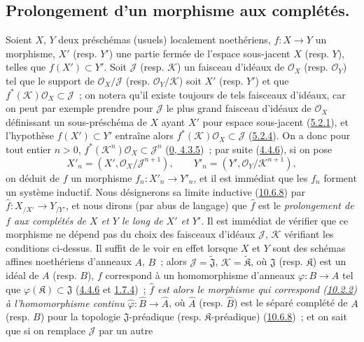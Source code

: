 \subsection{Prolongement d'un morphisme aux complétés.}
\label{subsection:I.10.9-fr}

\begin{env}[10.9.1]
\label{I.10.9.1-fr}
Soient $X$, $Y$ deux préschémas (usuels) localement noethériens,
$f:X\to Y$ un morphisme, $X'$ (resp. $Y'$) une partie fermée de l'espace
sous-jacent $X$ (resp. $Y$), telles que $f(X')\subset Y'$. Soit
$\mathscr{J}$ (resp. $\mathscr{K}$) un faisceau d'idéaux de
$\mathscr{O}_X$ (resp. $\mathscr{O}_Y$) tel que le support de
$\mathscr{O}_X/\mathscr{J}$ (resp. $\mathscr{O}_Y/\mathscr{K}$) soit
$X'$ (resp. $Y'$) et que
$f^*(\mathscr{K})\mathscr{O}_X\subset\mathscr{J}$~; on notera qu'il
existe toujours de tels faisceaux d'idéaux, car on peut par exemple prendre
pour $\mathscr{J}$ le plus grand faisceau d'idéaux de $\mathscr{O}_X$
définissant un sous-préschéma de $X$ ayant $X'$ pour espace sous-jacent
(\hyperref[I.5.2.1-fr]{5.2.1}), et l'hypothèse $f(X')\subset Y'$ entraîne
alors $f^*(\mathscr{K})\mathscr{O}_X\subset\mathscr{J}$
(\hyperref[I.5.2.4-fr]{5.2.4}). On a donc pour tout entier $n>0$,
$f^*(\mathscr{K}^n)\mathscr{O}_X\subset\mathscr{J}^n$
(\hyperref[0.4.3.5-fr]{0, 4.3.5})~; par suite
(\hyperref[I.4.4.6-fr]{4.4.6}), si on pose
\[
  X'_n=(X',\mathscr{O}_X/\mathscr{J}^{n+1}),\qquad
  Y'_n=(Y',\mathscr{O}_Y/\mathscr{K}^{n+1}),
\]
on déduit de $f$ un morphisme $f_n:X'_n\to Y'_n$, et il est immédiat que
les $f_n$ forment un système inductif. Nous désignerons sa limite inductive
(\hyperref[I.10.6.8-fr]{10.6.8}) par
$\widehat f:X_{/X'}\to Y_{/Y'}$, et nous dirons (par abus de langage) que
$\widehat f$ est le \emph{prolongement de $f$ aux complétés de $X$ et $Y$
le long de $X'$ et $Y'$}. Il est immédiat de vérifier que ce morphisme ne
dépend pas du choix des faisceaux d'idéaux $\mathscr{J}$, $\mathscr{K}$
vérifiant les conditions ci-dessus. Il suffit de le voir en effet lorsque
$X$ et $Y$ sont des schémas affines noethériens d'anneaux $A$, $B$~; alors
$\mathscr{J}=\widetilde{\mathfrak{J}}$,
$\mathscr{K}=\widetilde{\mathfrak{K}}$, où $\mathfrak{J}$ (resp.
$\mathfrak{K}$) est un idéal de $A$ (resp. $B$), $f$ correspond à un
homomorphisme d'anneaux $\varphi:B\to A$ tel que
$\varphi(\mathfrak{K})\subset\mathfrak{J}$
(\hyperref[I.4.4.6-fr]{4.4.6} et
\hyperref[I.1.7.4-fr]{1.7.4})~; \emph{$\widehat f$ est alors le morphisme
qui correspond (\hyperref[I.10.2.2-fr]{10.2.2}) à l'homomorphisme continu
$\widehat\varphi:\widehat B\to\widehat A$}, où $\widehat A$ (resp.
$\widehat B$) est le séparé complété de $A$ (resp. $B$) pour la topologie
$\mathfrak{J}$-préadique (resp. $\mathfrak{K}$-préadique)
(\hyperref[I.10.6.8-fr]{10.6.8})~; et on sait que si on remplace
$\mathscr{J}$ par un autre


\end{env}
